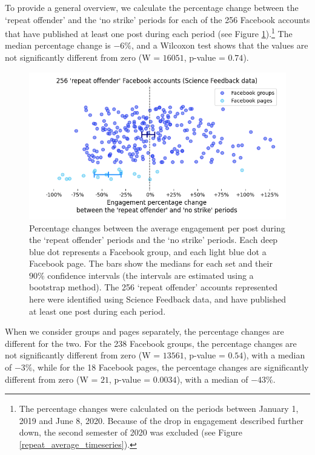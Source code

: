 \documentclass[review]{elsarticle}
\begin{document}
To provide a general overview, we calculate the percentage change between the `repeat offender' and the `no strike' periods for each of the 256 Facebook accounts that have published at least one post during each period (see Figure \ref{repeat_vs_free_percentage_change}).\footnote{The percentage changes were calculated on the periods between January 1, 2019 and June 8, 2020. Because of the drop in engagement described further down, the second semester of 2020 was excluded (see Figure \ref{repeat_average_timeseries}).}
The median percentage change is $-6\%$, and a Wilcoxon test shows that the values are not significantly different from zero (W = $16051$, p-value = $0.74$).


\begin{figure}[!h]
\centering
\includegraphics[scale=0.5]{./../figure/sf_repeat_vs_free_percentage_change.png}
\caption{
Percentage changes between the average engagement per post during the `repeat offender' periods and the `no strike' periods.
Each deep blue dot represents a Facebook group, and each light blue dot a Facebook page.
The bars show the medians for each set and their $90\%$ confidence intervals (the intervals are estimated using a bootstrap method).
The 256 `repeat offender' accounts represented here were identified using Science Feedback data, and have published at least one post during each period.
}
\label{repeat_vs_free_percentage_change}
\end{figure}

When we consider groups and pages separately, the percentage changes are different for the two.
For the 238 Facebook groups, the percentage changes are not significantly different from zero (W = $13561$, p-value = $0.54$), with a median of $-3\%$, while for the 18 Facebook pages, the percentage changes are significantly different from zero (W = $21$, p-value = $0.0034$), with a median of $-43\%$.
\end{document}
